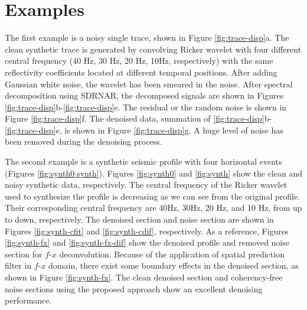 \section{Examples}




The first example is a noisy single trace, shown in Figure \ref{fig:trace-disp}a. The clean synthetic trace is generated by convolving Ricker wavelet with four different central frequency (40 Hz, 30 Hz, 20 Hz,  10Hz, respectively) with the same reflectivity coefficients located at different temporal positions. After adding Gaussian white noise, the wavelet has been smeared in the noise. After spectral decomposition using SDRNAR, the decomposed signals are shown in Figures \ref{fig:trace-disp}b-\ref{fig:trace-disp}e. The residual or the random noise is shown in Figure \ref{fig:trace-disp}f. The denoised data, summation of \ref{fig:trace-disp}b-\ref{fig:trace-disp}e, is shown in Figure \ref{fig:trace-disp}g. A huge level of noise has been removed during the denoising process. 

The second example is a synthetic seismic profile with four horizontal events (Figures \ref{fig:synth0,synth}). Figures \ref{fig:synth0} and \ref{fig:synth} show the clean and noisy synthetic data, respectively. The central frequency of the Ricker wavelet used to synthesize the profile is decreasing as we can see from the original profile. Their corresponding central frequency are 40Hz, 30Hz, 20 Hz, and 10 Hz, from up to down, respectively. The denoised section and  noise section are shown in Figures \ref{fig:synth-cfit} and \ref{fig:synth-cdif}, respectively. As a reference, Figures \ref{fig:synth-fx} and \ref{fig:synth-fx-dif} show the denoised profile and removed noise section for $f$-$x$ deconvolution. Because of the application of spatial prediction filter in $f$-$x$ domain, there exist some boundary effects in the denoised section, as shown in Figure \ref{fig:synth-fx}. The clean denoised section and coherency-free noise sections using the proposed approach show an excellent denoising performance. 

